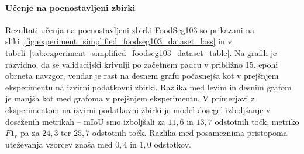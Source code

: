 \documentclass[a4paper,twoside,openright,12pt,slovene]{book}
\begin{document}
            \paragraph{Učenje na poenostavljeni zbirki}

            Rezultati učenja na poenostavljeni zbirki FoodSeg103 so prikazani na
            sliki~\ref{fig:experiment_simplified_foodseg103_dataset_loss}
            in v
            tabeli~\ref{tab:experiment_simplified_foodseg103_dataset_table}.
            Na grafih je razvidno, da se validacijski krivulji po začetnem padcu v
            približno 15. epohi obrneta navzgor, vendar je rast na desnem grafu
            počasnejša kot v prejšnjem eksperimentu na izvirni podatkovni
            zbirki. Razlika med levim in desnim grafom je manjša kot med
            grafoma v prejšnjem eksperimentu. V primerjavi z eksperimentom na
            izvirni podatkovni zbirki je model dosegel izboljšanje v doseženih
            metrikah -- mIoU smo izboljšali za $11{,}6$ in $13{,}7$ odstotnih
            točk, metriko $F1_r$ pa za $24{,}3$ ter $25{,}7$ odstotnih točk.
            Razlika med posameznima pristopoma uteževanja vzorcev znaša med
            $0{,}4$ in $1{,}0$ odstotkov.

            \FloatBarrier
\end{document}
